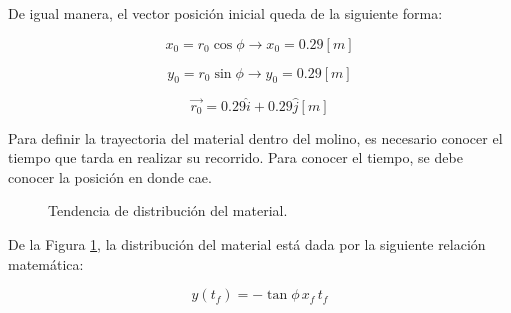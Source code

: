 \noindent
\justify

De igual manera, el vector posici\'on inicial queda de la siguiente forma:

\begin{equation*}
x_{0} = r_0 \cos \phi \rightarrow x_{0} = 0.29 [m]
\end{equation*}

\begin{equation*}
y_{0} = r_0 \sin \phi \rightarrow y_{0} = 0.29 [m]
\end{equation*}

\begin{equation}
\vec{r_0} = 0.29 \hat{i} + 0.29 \hat{j} [m]
\label{posicion}
\end{equation}

\noindent
\justify

Para definir la trayectoria del material dentro del molino, es necesario conocer el tiempo que tarda en realizar su recorrido. Para conocer el tiempo, se debe conocer la posici\'on en donde cae.

\begin{figure}[h!]
\centering
{}
\caption{Tendencia de distribuci\'on del material.}
\label{dist}
\end{figure}

\noindent
\justify

De la Figura \ref{dist}, la distribuci\'on del material est\'a dada por la siguiente relaci\'on matem\'atica:

\begin{equation}
y \left(t_f \right) = -\tan \phi \, x_f \, t_f
\label{tiempo}
\end{equation}

\noindent
\justify

